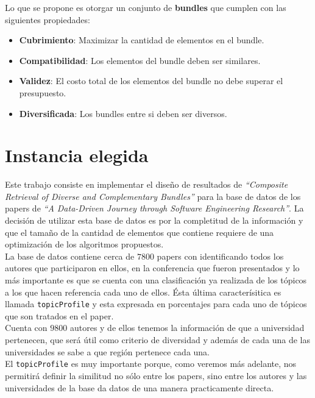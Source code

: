 Lo que se propone es otorgar un conjunto de \textbf{bundles} que cumplen con las siguientes propiedades:
\begin{itemize}
  \item \textbf{Cubrimiento}: Maximizar la cantidad de elementos en el bundle.
  \item \textbf{Compatibilidad}: Los elementos del bundle deben ser similares.
  \item \textbf{Validez}: El costo total de los elementos del bundle no debe superar el presupuesto.
  \item \textbf{Diversificada}: Los bundles entre si deben ser diversos.
\end{itemize}

\section{Instancia elegida}
Este trabajo consiste en implementar el diseño de resultados de \textit{\textquotedblleft Composite Retrieval of Diverse and Complementary Bundles\textquotedblright}\cite{compositeRetrival} para la base de datos de los papers de \textit{\textquotedblleft A Data-Driven Journey through Software Engineering Research\textquotedblright}\cite{dataDrive}. La decisión de utilizar esta base de datos es por la completitud de la información y que el tamaño de la cantidad de elementos que contiene requiere de una optimización de los algoritmos propuestos.\\
La base de datos contiene cerca de $7800$ papers con identificando todos los autores que participaron en ellos, en la conferencia que fueron presentados y lo más importante es que se cuenta con una clasificación ya realizada de los tópicos a los que hacen referencia cada uno de ellos. Ésta última caracterísitica es llamada \texttt{topicProfile} y esta expresada en porcentajes para cada uno de tópicos que son tratados en el paper.\\
Cuenta con $9800$ autores y de ellos tenemos la información de que a universidad pertenecen, que será útil como criterio de diversidad y además de cada una de las universidades se sabe a que región pertenece cada una.\\
El \texttt{topicProfile} es muy importante porque, como veremos más adelante, nos permitirá definir la similitud no sólo entre los papers, sino entre los autores y las universidades de la base da datos de una manera practicamente directa.
